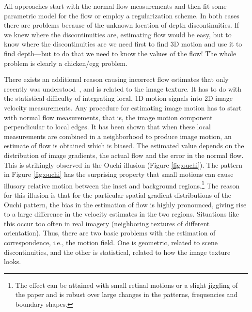 \documentclass[10pt,twocolumn]{article}
\begin{document}
All approaches start with the normal flow measurements and then fit
some parametric model for the flow or employ a regularization
scheme. In both cases there are problems because of the unknown
location of depth discontinuities.
If we knew where the discontinuities are,
estimating flow would be easy, but to know where the discontinuities
are we need first to find 3D motion and use it to find depth---but to
do that we need to know the values of the flow! The whole problem is
clearly a chicken/egg problem. 

There exists an additional reason causing incorrect flow estimates
that only recently was understood~\cite{ouchi-vr}, and is related to
the image texture. It has to do with the statistical difficulty of
integrating local, 1D motion signals into 2D image velocity
measurements. Any procedure for estimating image motion has to start
with normal flow measurements, that is, the image motion component
perpendicular to local edges. It has been shown \cite{ouchi-vr} that
when these local measurements are combined in a neighborhood to
produce image motion, an estimate of flow is obtained which is biased.
The estimated value depends on the distribution of image gradients,
the actual flow and the error in the normal flow. This is strikingly
observed in the Ouchi illusion (Figure \ref{fig:ouchi}). The pattern
in Figure \ref{fig:ouchi} has the surprising property that small
motions can cause illusory relative motion between the inset and
background regions.\footnote{The effect can be attained with small
retinal motions or a slight jiggling of the paper and is robust over
large changes in the patterns, frequencies and boundary shapes.} The
reason for this illusion is that for the particular spatial gradient
distributions of the Ouchi pattern, the bias in the estimation of flow
is highly pronounced, giving rise to a large difference in the
velocity estimates in the two regions. Situations like this occur too
often in real imagery (neighboring textures of different orientation).
Thus, there are two basic problems with the estimation of
correspondence, i.e., the motion field. One is geometric, related to
scene discontinuities, and the other is statistical, related to how the
image texture looks.
\end{document}
